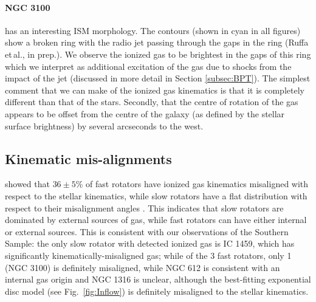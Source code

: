 	\paragraph{NGC 3100} has an interesting ISM morphology. The  contours (shown in cyan in all figures) show a broken ring with the radio jet passing through the gaps in the ring (Ruffa et\,al., in prep.). We observe the ionized gas to be brightest in the gaps of this ring which we interpret as additional excitation of the gas due to shocks from the impact of the jet (discussed in more detail in Section \ref{subsec:BPT}). The simplest comment that we can make of the ionized gas kinematics is that it is completely different than that of the stars. Secondly, that the centre of rotation of the gas appears to be offset from the centre of the galaxy (as defined by the stellar surface brightness) by several arcseconds to the west. 

	\subsection{Kinematic mis-alignments}
		\citet{Davis2011a} showed that $36\pm5$\% of fast rotators have ionized gas kinematics misaligned with respect to the stellar kinematics, while slow rotators have a flat distribution with respect to their misalignment angles \citep[see fig.\ 4]{Davis2011a}. This indicates that slow rotators are dominated by external sources of gas, while fast rotators can have either internal or external sources. This is consistent with our observations of the Southern Sample: the only slow rotator with detected ionized gas is IC 1459, which has significantly kinematically-misaligned gas; while of the 3 fast rotators, only 1 (NGC 3100) is definitely misaligned, while NGC 612 is consistent with an internal gas origin and NGC 1316 is unclear, although the best-fitting exponential disc model (see Fig.\ \ref{fig:Inflow}) is definitely misaligned to the stellar kinematics.

